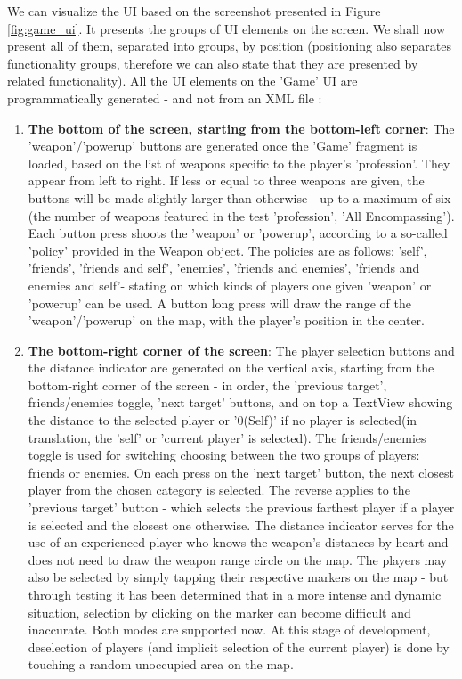 We can visualize the UI based on the screenshot presented in Figure
\ref{fig:game_ui}. It presents the groups of UI elements on the screen.
We shall now present all of them, separated into groups, by position
(positioning also separates functionality groups, therefore we can also state
that they are presented by related functionality). All the UI elements on the
'Game' UI are programmatically generated - and not from an XML file  :
\begin{enumerate}
  \item\textbf{The bottom of the screen, starting from the bottom-left corner}:
  The 'weapon'/'powerup' buttons are generated once the 'Game' fragment is loaded,
  based on the list of weapons specific to the player's 'profession'. They
  appear from left to right. If less or equal to three weapons are given, the
  buttons will be made slightly larger than otherwise - up to a maximum of six
  (the number of weapons featured in the test 'profession', 'All Encompassing').
  Each button press shoots the 'weapon' or 'powerup', according to a so-called
  'policy' provided in the Weapon object. The policies are as follows: 'self',
  'friends', 'friends and self', 'enemies', 'friends and enemies', 'friends and
  enemies and self'- stating on which kinds of players one given 'weapon' or
  'powerup' can be used. A button long press will draw the range of the
  'weapon'/'powerup' on the map, with the player's position in the center.
  
  \item\textbf{The bottom-right corner of the screen}: The player selection
  buttons and the distance indicator are generated on the vertical axis, starting from the
  bottom-right corner of the screen - in order, the 'previous target',
  friends/enemies toggle, 'next target' buttons, and on top a TextView showing
  the distance to the selected player or '0(Self)' if no player is selected(in
  translation, the 'self' or 'current player' is selected). The friends/enemies
  toggle is used for switching choosing between the two groups of players:
  friends or enemies. On each press on the 'next target' button,
  the next closest player from the chosen category is selected. The reverse
  applies to the 'previous target' button - which selects the previous farthest
  player if a player is selected and the closest one otherwise. The distance
  indicator serves for the use of an experienced player who knows the weapon's
  distances by heart and does not need to draw the weapon range circle on the
  map. The players may also be selected by simply tapping their respective
  markers on the map - but through testing it has been determined that in a more
  intense and dynamic situation, selection by clicking on the marker can become
  difficult and inaccurate. Both modes are supported now. At this stage of
  development, deselection of players (and implicit selection of the current
  player) is done by touching a random unoccupied area on the map.
  

\end{enumerate}
